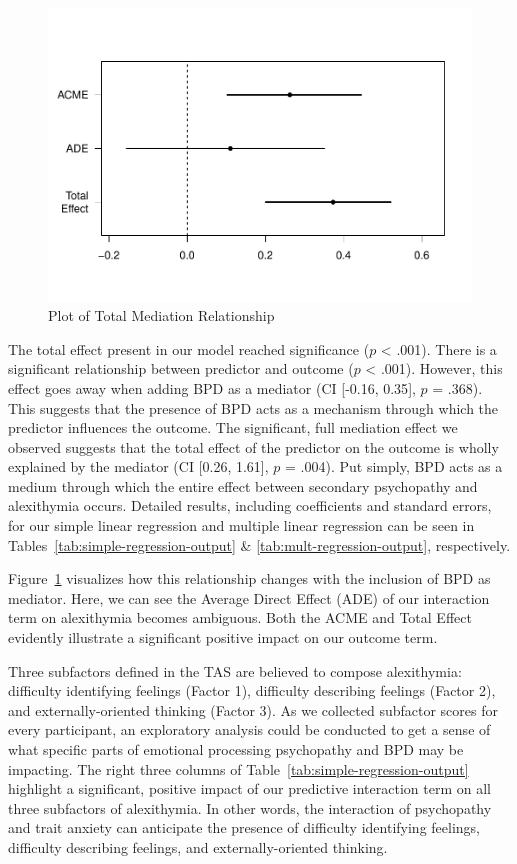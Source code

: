 \documentclass[
  man,floatsintext]{apa7}
\begin{document}
\begin{figure}
\includegraphics[width=1\linewidth]{d2m-Psychopathy_files/figure-latex/mediation-plot-1} \caption{Plot of Total Mediation Relationship}\label{fig:mediation-plot}
\end{figure}

The total effect present in our model reached significance (\(p\) \textless{} .001). There is a significant relationship between predictor and outcome (\(p\) \textless{} .001). However, this effect goes away when adding BPD as a mediator (CI {[}-0.16, 0.35{]}, \(p\) = .368). This suggests that the presence of BPD acts as a mechanism through which the predictor influences the outcome. The significant, full mediation effect we observed suggests that the total effect of the predictor on the outcome is wholly explained by the mediator (CI {[}0.26, 1.61{]}, \(p\) = .004). Put simply, BPD acts as a medium through which the entire effect between secondary psychopathy and alexithymia occurs. Detailed results, including coefficients and standard errors, for our simple linear regression and multiple linear regression can be seen in Tables~\ref{tab:simple-regression-output} \& \ref{tab:mult-regression-output}, respectively.

Figure~\ref{fig:mediation-plot} visualizes how this relationship changes with the inclusion of BPD as mediator. Here, we can see the Average Direct Effect (ADE) of our interaction term on alexithymia becomes ambiguous. Both the ACME and Total Effect evidently illustrate a significant positive impact on our outcome term.

Three subfactors defined in the TAS are believed to compose alexithymia: difficulty identifying feelings (Factor 1), difficulty describing feelings (Factor 2), and externally-oriented thinking (Factor 3). As we collected subfactor scores for every participant, an exploratory analysis could be conducted to get a sense of what specific parts of emotional processing psychopathy and BPD may be impacting. The right three columns of Table~\ref{tab:simple-regression-output} highlight a significant, positive impact of our predictive interaction term on all three subfactors of alexithymia. In other words, the interaction of psychopathy and trait anxiety can anticipate the presence of difficulty identifying feelings, difficulty describing feelings, and externally-oriented thinking.
\end{document}

